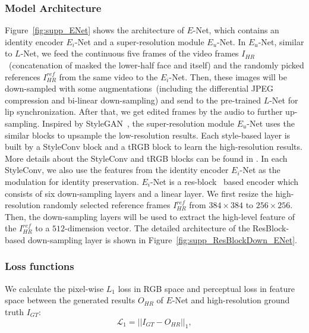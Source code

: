 \subsubsection{Model Architecture}
Figure~\ref{fig:supp_ENet} shows the architecture of $E$-Net, which contains an identity encoder $E_i$-Net and a super-resolution module $E_u$-Net. In $E_u$-Net, similar to $L$-Net, we feed the continuous five frames of the video frames $I_{HR}$~(concatenation of masked the lower-half face and itself) and the randomly picked references $I_{HR}^{ref}$ from the same video to the $E_i$-Net. Then, these images will be down-sampled with some augmentations~(including the differential JPEG compression and bi-linear down-sampling) and send to the pre-trained $L$-Net for lip synchronization. 
After that, we get edited frames by the audio to further up-sampling. Inspired by StyleGAN~\cite{stylegan2}, the super-resolution module $E_u$-Net uses the similar blocks to upsample the low-resolution results. Each style-based layer is built by a StyleConv block and a tRGB block to learn the high-resolution results. More details about the StyleConv and tRGB blocks can be found in \cite{stylegan2}.  
In each StyleConv, we also use the features from the identity encoder $E_i$-Net as the modulation for identity preservation. $E_i$-Net is a res-block~\cite{resnet} based encoder which consists of six down-sampling layers and a linear layer. We first resize the high-resolution randomly selected reference frames $I_{HR}^{ref}$ from $384\times384$ to $256\times256$. Then, the down-sampling layers will be used to extract the high-level feature of the $I_{HR}^{ref}$ to a $512$-dimension vector. The detailed architecture of the ResBlock-based down-sampling layer is shown in Figure~\ref{fig:supp_ResBlockDown_ENet}. 



\subsubsection{Loss functions}
We calculate the pixel-wise $L_1$ loss in RGB space and perceptual loss in feature space between the generated results $O_{HR}$ of $E$-Net and high-resolution ground truth $I_{GT}$:
\begin{equation}
\mathcal{L}_1 = \vert\vert I_{GT}-O_{HR}\vert\vert_1,
\end{equation}

